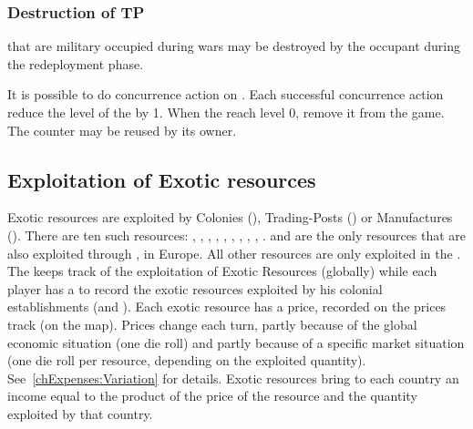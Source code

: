 \subsubsection{Destruction of TP}
\aparag \TP that are military occupied during wars may be destroyed by the
occupant during the redeployment phase.

\aparag It is possible to do concurrence action on \TP. Each successful
concurrence action reduce the level of the \TP by 1.
\bparag When the \TP reach level 0, remove it from the game. The counter may
be reused by its owner.






\subsection{Exploitation of Exotic resources}

\label{chThePowers:ResourcesExploitation}
\aparag[Resources] Exotic resources are exploited by Colonies (\COL),
Trading-Posts (\TP) or Manufactures (\MNU). There are ten such resources:
, , , , , , , , , .
\bparag {} and  are the only resources that are also
exploited through \MNU, in Europe. All other resources are only exploited in
the \ROTW.
\bparag The  keeps track of the
exploitation of Exotic Resources (globally) while each player has a
 to record the exotic resources exploited by his
colonial establishments (and \MNU).
\aparag Each exotic resource has a price, recorded on the prices track (on the
\ROTW map).
\bparag Prices change each turn, partly because of the global economic
situation (one die roll) and partly because of a specific market situation
(one die roll per resource, depending on the exploited
quantity). See~\ref{chExpenses:Variation} for details.
\bparag Exotic resources bring to each country an income equal to the product
of the price of the resource and the quantity exploited by that country.

